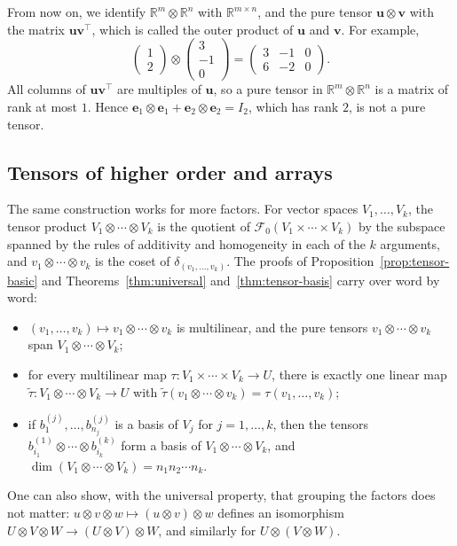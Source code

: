 \documentclass[11pt]{article}
\theoremstyle{definition}
\theoremstyle{plain}
\theoremstyle{remark}
\begin{document}
From now on, we identify $\mathbb{R}^m \otimes \mathbb{R}^n$ with $\mathbb{R}^{m \times n}$, and the pure tensor $\mathbf{u} \otimes \mathbf{v}$ with the matrix $\mathbf{u}\mathbf{v}^\top$, which is called the outer product of $\mathbf{u}$ and $\mathbf{v}$. For example,
\[\begin{pmatrix} 1 \\ 2 \end{pmatrix} \otimes \begin{pmatrix} 3 \\ -1 \\ 0 \end{pmatrix} = \begin{pmatrix} 3 & -1 & 0 \\ 6 & -2 & 0 \end{pmatrix}.\]
All columns of $\mathbf{u}\mathbf{v}^\top$ are multiples of $\mathbf{u}$, so a pure tensor in $\mathbb{R}^m \otimes \mathbb{R}^n$ is a matrix of rank at most $1$. Hence $\mathbf{e}_1 \otimes \mathbf{e}_1 + \mathbf{e}_2 \otimes \mathbf{e}_2 = I_2$, which has rank $2$, is not a pure tensor.

\subsection{Tensors of higher order and arrays}

The same construction works for more factors. For vector spaces $V_1, \ldots, V_k$, the tensor product $V_1 \otimes \cdots \otimes V_k$ is the quotient of $\mathcal{F}_0(V_1 \times \cdots \times V_k)$ by the subspace spanned by the rules of additivity and homogeneity in each of the $k$ arguments, and $v_1 \otimes \cdots \otimes v_k$ is the coset of $\delta_{(v_1, \ldots, v_k)}$. The proofs of Proposition~\ref{prop:tensor-basic} and Theorems~\ref{thm:universal} and~\ref{thm:tensor-basis} carry over word by word:
\begin{itemize}
    \item $(v_1, \ldots, v_k) \mapsto v_1 \otimes \cdots \otimes v_k$ is multilinear, and the pure tensors $v_1 \otimes \cdots \otimes v_k$ span $V_1 \otimes \cdots \otimes V_k$;
    \item for every multilinear map $\tau: V_1 \times \cdots \times V_k \to U$, there is exactly one linear map $\tilde\tau: V_1 \otimes \cdots \otimes V_k \to U$ with $\tilde\tau(v_1 \otimes \cdots \otimes v_k) = \tau(v_1, \ldots, v_k)$;
    \item if $b^{(j)}_1, \ldots, b^{(j)}_{n_j}$ is a basis of $V_j$ for $j = 1, \ldots, k$, then the tensors $b^{(1)}_{i_1} \otimes \cdots \otimes b^{(k)}_{i_k}$ form a basis of $V_1 \otimes \cdots \otimes V_k$, and $\dim(V_1 \otimes \cdots \otimes V_k) = n_1 n_2 \cdots n_k$.
\end{itemize}
One can also show, with the universal property, that grouping the factors does not matter: $u \otimes v \otimes w \mapsto (u \otimes v) \otimes w$ defines an isomorphism $U \otimes V \otimes W \to (U \otimes V) \otimes W$, and similarly for $U \otimes (V \otimes W)$.
\end{document}
